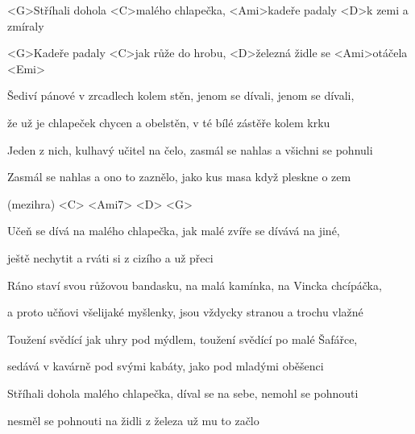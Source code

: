 

\zs
<G>Stříhali dohola <C>malého chlapečka,
<Ami>kadeře padaly <D>k zemi a zmíraly

<G>Kadeře padaly <C>jak růže do hrobu,
<D>železná židle se <Ami>otáčela <Emi>
\ks

\zs
Šediví pánové v zrcadlech kolem stěn,
jenom se dívali, jenom se dívali,

že už je chlapeček chycen a obelstěn,
v té bílé zástěře kolem krku
\ks

\zs
Jeden z nich, kulhavý učitel na čelo,
zasmál se nahlas a všichni se pohnuli

Zasmál se nahlas a ono to zaznělo,
jako kus masa když pleskne o zem
\ks

\zs
(mezihra) <C> <Ami7> <D> <G>
\ks

\zs
Učeň se dívá na malého chlapečka,
jak malé zvíře se dívává na jiné,

ještě nechytit a rváti si z cizího
a už přeci
\ks

\zs
Ráno staví svou růžovou bandasku,
na malá kamínka, na Vincka chcípáčka,

a proto učňovi všelijaké myšlenky,
jsou vždycky stranou a trochu vlažné
\ks

\zs
Toužení svědící jak uhry pod mýdlem,
toužení svědící po malé Šafářce,

sedává v kavárně pod svými kabáty,
jako pod mladými oběšenci
\ks

\zs
Stříhali dohola malého chlapečka,
díval se na sebe, nemohl se pohnouti

nesměl se pohnouti na židli z železa
už mu to začlo
\ks

\kp
